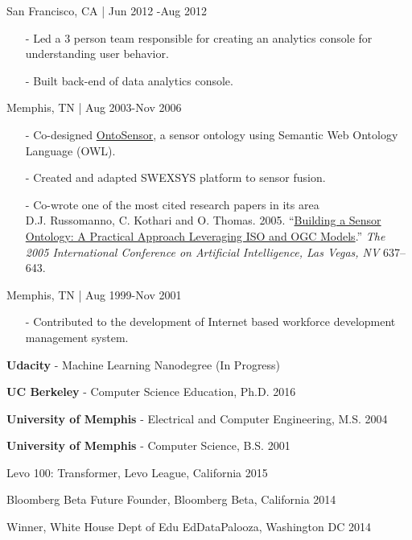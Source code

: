 \documentclass[10.5pt,article,oneside]{memoir}
\begin{document}
 \hfill San Francisco, CA | Jun 2012 -Aug 2012
\begin{itemize}[noitemsep,nolistsep]
\item[-]Led a 3 person team responsible for creating an analytics console for understanding user behavior.
\item[-]Built back-end of data analytics console.
\end{itemize} 

 \hfill Memphis, TN | Aug 2003-Nov 2006
\begin{itemize}[noitemsep,nolistsep]
\item[-]Co-designed \href{https://scholar.google.com/scholar?hl=en&q=Building+a+Sensor+Ontology\%3A+A+Practical+Approach+Leveraging+ISO+and+OGC+Models.&btnG=&as_sdt=1\%2C43&as_sdtp=}{OntoSensor}, a sensor ontology using Semantic Web Ontology Language (OWL).
\item[-]Created and adapted SWEXSYS platform to sensor fusion.
\item[-]Co-wrote one of the most cited research papers in its area\\
\ind D.J. Russomanno, C. Kothari and O. Thomas. 2005. ``\href{https://scholar.google.com/citations?view_op=view_citation&hl=en&user=E7z_wrwAAAAJ&sortby=pubdate&citation_for_view=E7z_wrwAAAAJ:u5HHmVD_uO8C}{Building a Sensor Ontology: A Practical Approach Leveraging ISO and OGC Models}.'' \emph{The 2005 International Conference on Artificial Intelligence, Las Vegas, NV} 637--643. 
\end{itemize}

 \hfill Memphis, TN | Aug 1999-Nov 2001
\begin{itemize}[noitemsep,nolistsep]
\item[-]Contributed to the development of Internet based workforce development management system.
\end{itemize} 

\bigskip 


\ind \textbf{Udacity} - Machine Learning Nanodegree  \hfill (In Progress)

\ind \textbf{UC Berkeley} - Computer Science Education, Ph.D. \hfill 2016

\ind \textbf{University of Memphis} - Electrical and Computer Engineering, M.S. \hfill 2004

\ind \textbf{University of Memphis} - Computer Science, B.S. \hfill 2001

\bigskip 

\medskip

\ind Levo 100: Transformer, Levo League, California \hfill 2015

\ind Bloomberg Beta Future Founder, Bloomberg Beta, California \hfill 2014 

\ind Winner, White House Dept of Edu EdDataPalooza, Washington DC \hfill 2014
\end{document}
